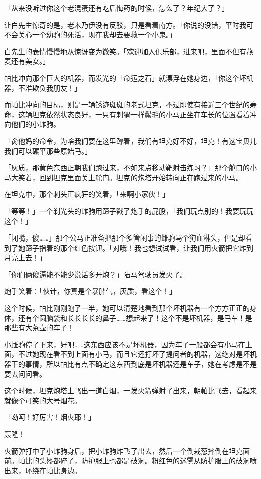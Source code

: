「从来没听过你这个老混蛋还有吃后悔药的时候，怎么了？年纪大了？」

让白先生惊奇的是，老木乃伊没有反驳，只是看着南方。「你说的没错，平时我可不会关心一个幼驹的死活，现在我却去要救一个小鬼。」

白先生的表情慢慢地从惊讶变为微笑。「欢迎加入俱乐部，进来吧，里面不但有燕麦还有美女。」

\horizonline


帕比冲向那个巨大的机器，而发光的「命运之石」就漂浮在她身边，「你这个坏机器，不准欺负我朋友！」

而帕比冲向的目标，则是一辆锈迹斑斑的老式坦克，不过即使有接近三个世纪的寿命，这辆坦克依然状态良好，一只有刺猬一样鬃毛的小马正坐在车长的位置看着冲向他们的小雌驹。

「肏他妈的命令，为啥我们要在这里蹲着，我们有坦克好不好，坦克！有这宝贝儿我们可以碾平那些原始马。」

「灰质，那黄色东西正朝我们跑过来，不如来点移动靶射击练习？」那个舱口的小马大笑着，回到坦克里面关上舱门。坦克的炮塔开始转向正在跑过来的小马。

在坦克中，那个刺头正疯狂的笑着，「来啊小家伙！」

「等等！」一个剃光头的雌驹用蹄子戳了炮手的屁股，「我们玩点别的！我要玩玩这个！」

「闭嘴，傻……」那个公马正准备把那个多管闲事的雌驹骂个狗血淋头，但是却看到了她蹄子指着的那个红色按钮。「对哦！我也想试试看，让我们用火箭把它炸到月亮上去！」

「你们俩傻逼能不能少说话多开炮？」陆马驾驶员发火了。

炮手笑着：「伙计，你真是个暴脾气，灰质，看这个！」

这个时候，帕比刚刚跑了一半，她可以清楚地看到那个坏机器有一个方方正正的身体，还有个圆脑袋和长长长长的鼻子……想起来了！这个不是坏机器，是马车！是那些有大茶壶的车子！

小雌驹停了下来，好吧……这东西应该不是坏机器，因为车子一般都会有小马在上面，不过她现在看不到上面有小马，而且它还打坏了提问者的机器，这绝对是坏机器干的事情，所以帕比有点不确定这东西到底是坏机器还是车子，她在考虑是不是要去问问看。

这个时候，坦克炮塔上飞出一道白烟，一发火箭弹射了出来，朝帕比飞去，看起来就像个可笑的大号烟花。

「呦呵！好厉害！烟火耶！」

轰隆！

火箭弹打中了小雌驹身后，把小雌驹炸飞了出去，然后一个倒栽葱摔倒在坦克面前。帕比的头盔都碎了，防护服上也都是破洞。粉红色的迷雾从防护服上的破洞喷出来，环绕在帕比身边。


